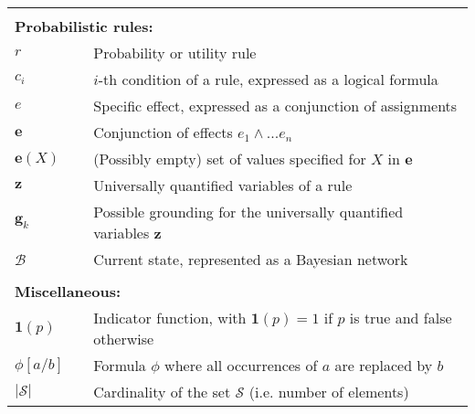 \begin{longtable}{lp{5mm}p{11cm}}
&&  \vspace{3mm} \\
\multicolumn{3}{l}{\textbf{Probabilistic rules:}} \vspace{2mm} \\
$r$ && Probability or utility rule \\
$c_i$ && $i$-th condition of a rule, expressed as a logical formula \\
$e$ && Specific effect, expressed as a conjunction of assignments \\
$\mathbf{e}$ && Conjunction of effects $e_1 \land ... e_n$ \\
$\mathbf{e}(X)$ && (Possibly empty) set of values specified for $X$ in $\mathbf{e}$ \\
$\mathbf{z}$ && Universally quantified variables of a rule  \\
$\mathbf{g}_k$ && Possible grounding for the universally quantified variables $\mathbf{z}$ \\
$\mathcal{B}$ && Current state, represented as a Bayesian network \\
&&  \vspace{3mm} \\
\multicolumn{3}{l}{\textbf{Miscellaneous:}} \vspace{2mm} \\
$\mathbf{1}(p)$ && Indicator function, with $\mathbf{1}(p) = 1$ if $p$ is true and false otherwise \\
$\phi[a / b]$ && Formula $\phi$ where all occurrences of $a$ are replaced by $b$ \\
$|\mathcal{S}|$ && Cardinality of the set $\mathcal{S}$ (i.e. number of elements) 
\end{longtable}
